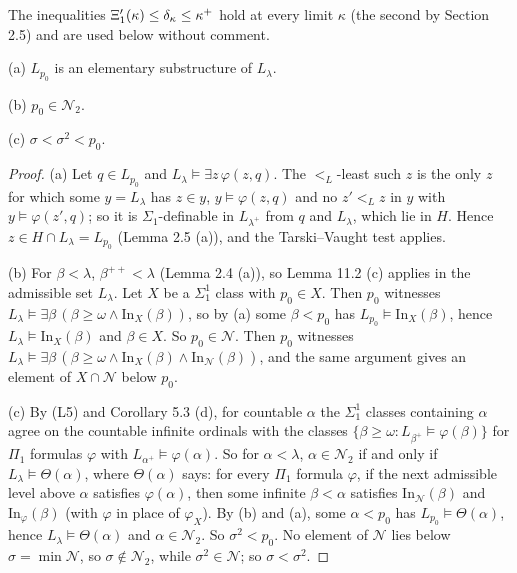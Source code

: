 \documentclass[11pt]{article}
\begin{document}
The inequalities $\Xi'_1(\kappa) \le \delta_{\kappa} \le \kappa^+$ hold at every limit $\kappa$ (the second by
Section 2.5) and are used below without comment.

\begin{statement} (a) $L_{p_0}$ is an elementary substructure of $L_\lambda$.

(b) $p_0 \in \mathcal N_2$.

(c) $\sigma < \sigma^2 < p_0$.
\end{statement}

\begin{proof} (a) Let $q \in L_{p_0}$ and $L_\lambda \models \exists z\, \varphi(z, q)$. The $<_L$-least such $z$ is
the only $z$ for which some $y = L_\lambda$ has $z \in y$, $y \models \varphi(z, q)$ and no $z' <_L z$ in $y$ with
$y \models \varphi(z', q)$; so it is $\Sigma_1$-definable in $L_{\lambda^+}$ from $q$ and $L_\lambda$, which lie in $H$. Hence
$z \in H \cap L_\lambda = L_{p_0}$ (Lemma 2.5 (a)), and the Tarski--Vaught test applies.

(b) For $\beta < \lambda$, $\beta^{++} < \lambda$ (Lemma 2.4 (a)), so Lemma 11.2 (c) applies in the admissible set $L_\lambda$. Let
$X$ be a $\Sigma^1_1$ class with $p_0 \in X$. Then $p_0$ witnesses
$L_\lambda \models \exists \beta\, (\beta \ge \omega \wedge \mathrm{In}_X(\beta))$, so by (a) some $\beta < p_0$ has
$L_{p_0} \models \mathrm{In}_X(\beta)$, hence $L_\lambda \models \mathrm{In}_X(\beta)$ and $\beta \in X$. So
$p_0 \in \mathcal N$. Then $p_0$ witnesses
$L_\lambda \models \exists \beta\, (\beta \ge \omega \wedge \mathrm{In}_X(\beta) \wedge \mathrm{In}_{\mathcal N}(\beta))$,
and the same argument gives an element of $X \cap \mathcal N$ below $p_0$.

(c) By (L5) and Corollary 5.3 (d), for countable $\alpha$ the $\Sigma^1_1$ classes containing $\alpha$ agree on
the countable infinite ordinals with the classes $\{\beta \ge \omega : L_{\beta^+} \models \varphi(\beta)\}$ for
$\Pi_1$ formulas $\varphi$ with $L_{\alpha^+} \models \varphi(\alpha)$. So for $\alpha < \lambda$, $\alpha \in \mathcal N_2$
if and only if $L_\lambda \models \Theta(\alpha)$, where $\Theta(\alpha)$ says: for every $\Pi_1$ formula $\varphi$, if
the next admissible level above $\alpha$ satisfies $\varphi(\alpha)$, then some infinite $\beta < \alpha$ satisfies
$\mathrm{In}_{\mathcal N}(\beta)$ and $\mathrm{In}_{\varphi}(\beta)$ (with $\varphi$ in place of $\varphi_X$). By
(b) and (a), some $\alpha < p_0$ has $L_{p_0} \models \Theta(\alpha)$, hence $L_\lambda \models \Theta(\alpha)$ and
$\alpha \in \mathcal N_2$. So $\sigma^2 < p_0$. No element of $\mathcal N$ lies below $\sigma = \min \mathcal N$,
so $\sigma \notin \mathcal N_2$, while $\sigma^2 \in \mathcal N$; so $\sigma < \sigma^2$.
\end{proof}
\end{document}
